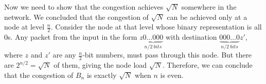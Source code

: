 \documentclass[twoside,12pt]{article}
\begin{document}
\begin{problem}[20 points]
{Now we need to show that the congestion achieves $\sqrt{N}$
somewhere in the network. We concluded that the congestion of
$\sqrt{N}$ can be achieved only at a node at level $\frac{n}{2}$.
Consider the node at that level whose binary representation is all
$0$s. Any packet from the input in the form
$z\underbrace{0\ldots000}_{n/2\ bits}$ with destination
$\underbrace{000\ldots0}_{n/2\ bits}z'$, where $z$ and $z'$ are any
$\frac{n}{2}$-bit numbers, must pass through this node. But there
are $2^{n/2}=\sqrt{N}$ of them, giving the node load $\sqrt{N}$.
Therefore, we can conclude that the congestion of $B_n$ is exactly
$\sqrt{N}$ when $n$ is even.

%

}

\end{problem}


\end{document}
